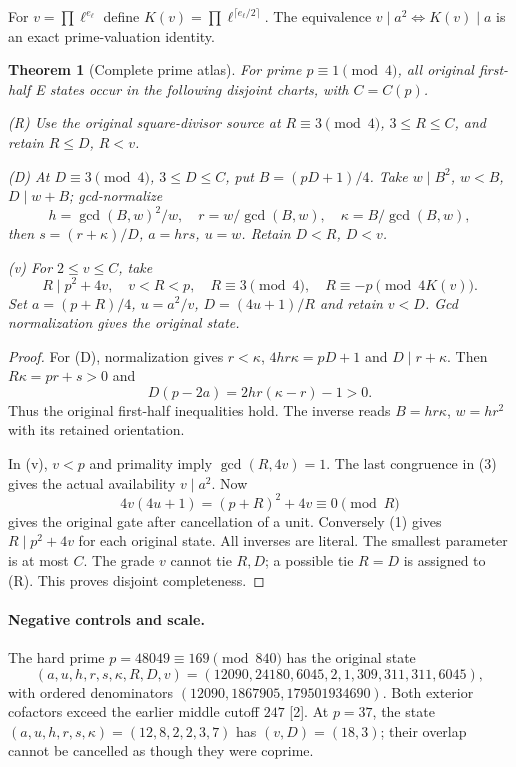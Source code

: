 \documentclass[11pt,reqno]{amsart}
\newtheorem{theorem}{Theorem}\newtheorem{corollary}[theorem]{Corollary}
\begin{document}
For $v=\prod\ell^{e_\ell}$ define
$K(v)=\prod\ell^{\lceil e_\ell/2\rceil}$. The equivalence
$v\mid a^2\iff K(v)\mid a$ is an exact prime-valuation identity.

\begin{theorem}[Complete prime atlas]
For prime $p\equiv1\pmod4$, all original first-half E states occur in the
following disjoint charts, with $C=C(p)$.

\textup{(R)} Use the original square-divisor source at
$R\equiv3\pmod4$, $3\le R\le C$, and retain $R\le D$, $R<v$.

\textup{(D)} At $D\equiv3\pmod4$, $3\le D\le C$, put $B=(pD+1)/4$.
Take $w\mid B^2$, $w<B$, $D\mid w+B$; gcd-normalize
\[
 h=\gcd(B,w)^2/w,\quad r=w/\gcd(B,w),\quad\kappa=B/\gcd(B,w),
\]
then $s=(r+\kappa)/D$, $a=hrs$, $u=w$. Retain $D<R$, $D<v$.

\textup{(v)} For $2\le v\le C$, take
\[
 \boxed{R\mid p^2+4v,\quad v<R<p,\quad R\equiv3\pmod4,
 \quad R\equiv-p\pmod{4K(v)}.}                          \tag{3}
\]
Set $a=(p+R)/4$, $u=a^2/v$, $D=(4u+1)/R$ and retain $v<D$.
Gcd normalization gives the original state.
\end{theorem}
\begin{proof}
For (D), normalization gives $r<\kappa$, $4hr\kappa=pD+1$ and
$D\mid r+\kappa$. Then $R\kappa=pr+s>0$ and
\[
 D(p-2a)=2hr(\kappa-r)-1>0.
\]
Thus the original first-half inequalities hold. The inverse reads
$B=hr\kappa$, $w=hr^2$ with its retained orientation.

In (v), $v<p$ and primality imply $\gcd(R,4v)=1$. The last congruence in
(3) gives the actual availability $v\mid a^2$. Now
\[
 4v(4u+1)=(p+R)^2+4v\equiv0\pmod R
\]
gives the original gate after cancellation of a unit. Conversely (1) gives
$R\mid p^2+4v$ for each original state. All inverses are literal.
The smallest parameter is at most $C$. The grade $v$ cannot tie $R,D$;
a possible tie $R=D$ is assigned to (R). This proves disjoint completeness.
\end{proof}

\paragraph{Negative controls and scale.}
The hard prime $p=48049\equiv169\pmod{840}$ has the original state
\[
 (a,u,h,r,s,\kappa,R,D,v)
 =(12090,24180,6045,2,1,309,311,311,6045),
\]
with ordered denominators $(12090,1867905,179501934690)$. Both exterior
cofactors exceed the earlier middle cutoff $247$ [2]. At $p=37$, the state
$(a,u,h,r,s,\kappa)=(12,8,2,2,3,7)$ has $(v,D)=(18,3)$; their overlap
cannot be cancelled as though they were coprime.
\end{document}
